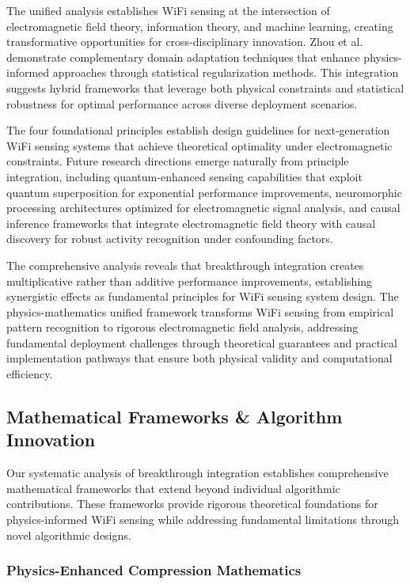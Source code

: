 \documentclass[journal]{IEEEtran}
\begin{document}
The unified analysis establishes WiFi sensing at the intersection of electromagnetic field theory, information theory, and machine learning, creating transformative opportunities for cross-disciplinary innovation. Zhou et al. \cite{zhou2024mixstyle} demonstrate complementary domain adaptation techniques that enhance physics-informed approaches through statistical regularization methods. This integration suggests hybrid frameworks that leverage both physical constraints and statistical robustness for optimal performance across diverse deployment scenarios.

The four foundational principles establish design guidelines for next-generation WiFi sensing systems that achieve theoretical optimality under electromagnetic constraints. Future research directions emerge naturally from principle integration, including quantum-enhanced sensing capabilities that exploit quantum superposition for exponential performance improvements, neuromorphic processing architectures optimized for electromagnetic signal analysis, and causal inference frameworks that integrate electromagnetic field theory with causal discovery for robust activity recognition under confounding factors.

The comprehensive analysis reveals that breakthrough integration creates multiplicative rather than additive performance improvements, establishing synergistic effects as fundamental principles for WiFi sensing system design. The physics-mathematics unified framework transforms WiFi sensing from empirical pattern recognition to rigorous electromagnetic field analysis, addressing fundamental deployment challenges through theoretical guarantees and practical implementation pathways that ensure both physical validity and computational efficiency.

\subsection{Mathematical Frameworks \& Algorithm Innovation}

Our systematic analysis of breakthrough integration establishes comprehensive mathematical frameworks that extend beyond individual algorithmic contributions. These frameworks provide rigorous theoretical foundations for physics-informed WiFi sensing while addressing fundamental limitations through novel algorithmic designs.

\subsubsection{Physics-Enhanced Compression Mathematics}
\end{document}
